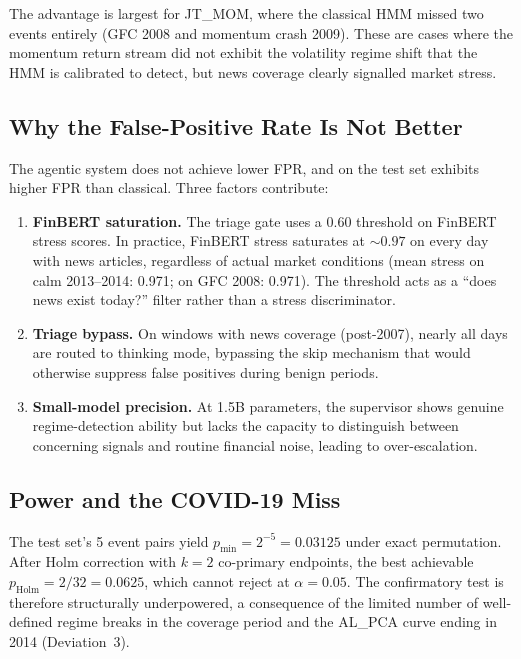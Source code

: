 \documentclass[11pt,a4paper]{article}
\begin{document}
The advantage is largest for JT\_MOM, where the classical HMM missed two
events entirely (GFC 2008 and momentum crash 2009). These are cases where
the momentum return stream did not exhibit the volatility regime shift that
the HMM is calibrated to detect, but news coverage clearly signalled market
stress.

\subsection{Why the False-Positive Rate Is Not Better}\label{sec:why-fpr}

The agentic system does not achieve lower FPR, and on the test set exhibits
higher FPR than classical. Three factors contribute:

\begin{enumerate}
  \item \textbf{FinBERT saturation.} The triage gate uses a 0.60 threshold
        on FinBERT stress scores. In practice, FinBERT stress saturates at
        ${\sim}0.97$ on every day with news articles, regardless of actual
        market conditions (mean stress on calm 2013--2014: 0.971; on GFC
        2008: 0.971). The threshold acts as a ``does news exist today?''
        filter rather than a stress discriminator.
  \item \textbf{Triage bypass.} On windows with news coverage (post-2007),
        nearly all days are routed to thinking mode, bypassing the skip
        mechanism that would otherwise suppress false positives during
        benign periods.
  \item \textbf{Small-model precision.} At 1.5B parameters, the supervisor
        shows genuine regime-detection ability but lacks the capacity to
        distinguish between concerning signals and routine financial noise,
        leading to over-escalation.
\end{enumerate}

\subsection{Power and the COVID-19 Miss}\label{sec:power}\label{sec:power-miss}

The test set's 5 event pairs yield $p_\text{min} = 2^{-5} = 0.03125$ under
exact permutation. After Holm correction with $k = 2$ co-primary endpoints,
the best achievable $p_\text{Holm} = 2/32 = 0.0625$, which cannot reject at
$\alpha = 0.05$. The confirmatory test is therefore structurally underpowered,
a consequence of the limited number of well-defined regime breaks in the
coverage period and the AL\_PCA curve ending in 2014 (Deviation~3).
\end{document}
